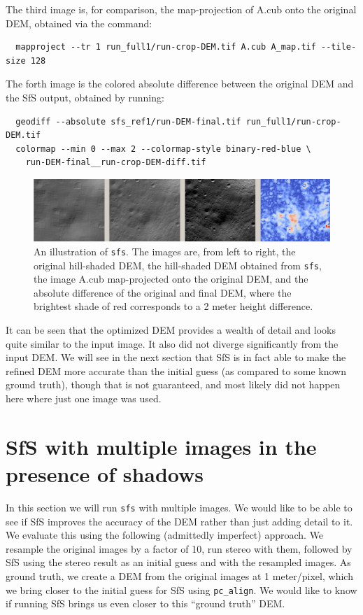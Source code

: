The third image is, for comparison, the map-projection of A.cub onto the
original DEM, obtained via the command:
\begin{verbatim}
  mapproject --tr 1 run_full1/run-crop-DEM.tif A.cub A_map.tif --tile-size 128
\end{verbatim}
The forth image is the colored absolute difference between the original
DEM and the SfS output, obtained by running:
\begin{verbatim}
  geodiff --absolute sfs_ref1/run-DEM-final.tif run_full1/run-crop-DEM.tif
  colormap --min 0 --max 2 --colormap-style binary-red-blue \
    run-DEM-final__run-crop-DEM-diff.tif
\end{verbatim}
\begin{figure}[h!]
  \begin{center}
    \includegraphics[width=7in]{images/sfs1.jpg}
    \caption[sfs]{An illustration of \texttt{sfs}. The images are, from
      left to right, the original hill-shaded DEM, the hill-shaded DEM obtained
      from \texttt{sfs}, the image A.cub map-projected onto the original DEM,
      and the absolute difference of the original and final DEM, where the brightest
      shade of red corresponds to a 2 meter height difference.}
    \label{fig:sfs1}
  \end{center}
\end{figure}

It can be seen that the optimized DEM provides a wealth of detail and
looks quite similar to the input image. It also did not diverge
significantly from the input DEM. We will see in the next section that
SfS is in fact able to make the refined DEM more accurate than the
initial guess (as compared to some known ground truth), though that is
not guaranteed, and most likely did not happen here where just one image
was used.

\section{SfS with multiple images in the presence of shadows}

In this section we will run \texttt{sfs} with multiple images. We would
like to be able to see if SfS improves the accuracy of the DEM rather
than just adding detail to it. We evaluate this using the following
(admittedly imperfect) approach. We resample the original images by a
factor of 10, run stereo with them, followed by SfS using the stereo
result as an initial guess and with the resampled images. As ground
truth, we create a DEM from the original images at 1 meter/pixel, which
we bring closer to the initial guess for SfS using
\texttt{pc\_align}. We would like to know if running SfS brings us even
closer to this ``ground truth'' DEM.

